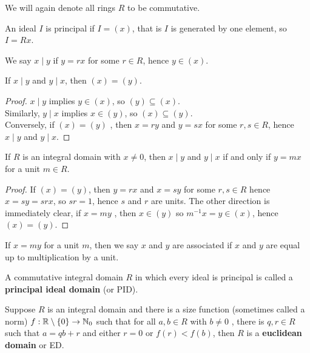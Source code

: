 We will again denote all rings \(R\) to be commutative.
\begin{recall}
	An ideal \(I\) is principal if \(I = \left( x \right) \), that is \(I\) is generated by one element, so \(I = Rx\).
\end{recall}
\begin{notation}
	We say \(x \mid y\) if \(y = rx\) for some \(r \in R\), hence \(y \in \left( x \right) \).
\end{notation}
\begin{proposition}
	If \(x \mid y\) and \(y \mid x\), then \(\left( x \right)  = \left( y \right) \).
\end{proposition}
\begin{proof}
	\(x \mid y\) 	implies \(y \in \left( x \right) \), so \(\left( y \right) \subseteq \left( x \right) \).\\
	Similarly, \(y \mid x\) implies \(x \in \left( y \right) \), so \(\left( x \right) \subseteq \left( y \right) \).\\
	Conversely, if \(\left( x \right)  = \left( y \right) \) , then \(x = ry\) and \(y = sx\) for some \(r, s \in R\), hence \(x \mid y\) and \(y \mid x\).
\end{proof}
\begin{proposition}
	If \(R\) is an integral domain with \(x \neq 0\), then \(x \mid y\) and \(y \mid x\) if and only if \(y = mx\) for a unit \(m \in R\).
\end{proposition}
\begin{proof}
	If \(\left( x \right)  = \left( y \right) \), then \(y = rx\) and \(x = sy\) for some \(r, s \in R\) hence \(x =sy =sr x\), so \( s r = 1\), hence \(s\) and \(r\) are units. The other direction is immediately clear, if \(x = my\) , then \(x \in\left( y \right) \) so \(m^{-1}x = y \in \left( x \right) \), hence \(\left( x \right)  = \left( y \right) \).
\end{proof}
\begin{remark}
	If \(x = my\) for a unit \(m\), then we say \(x\) and \(y\) are associated if \(x\) and \(y\) are equal up to multiplication by a unit.
\end{remark}
\begin{definition}
	A commutative integral domain \(R\) in which every ideal is principal is called a \textbf{principal ideal domain} (or PID).
\end{definition}
\begin{definition}
	Suppose \(R\) is an integral domain and there is a size function (sometimes called a norm) \(f: \mathbb{R} \setminus \{0\}  \to \mathbb{N}_{0} \) such that for all \(a, b \in R\)  with \(b \neq 0\) , there is \(q, r \in R\) such that \(a = qb + r\) and either \(r = 0\) or \(f\left( r \right)  < f\left( b \right) \), then \(R\) is a \textbf{euclidean domain} or ED.
\end{definition}
